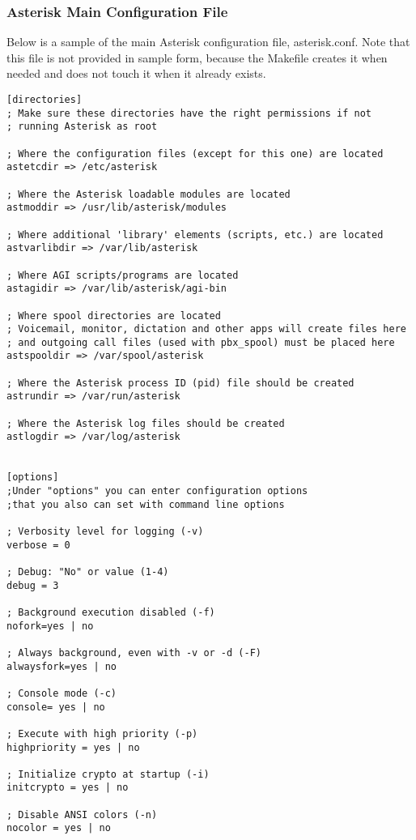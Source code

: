 \subsubsection{Asterisk Main Configuration File}

Below is a sample of the main Asterisk configuration file,
asterisk.conf. Note that this file is not provided in
sample form, because the Makefile creates it when needed
and does not touch it when it already exists.

\begin{verbatim}
[directories]
; Make sure these directories have the right permissions if not
; running Asterisk as root 

; Where the configuration files (except for this one) are located
astetcdir => /etc/asterisk

; Where the Asterisk loadable modules are located
astmoddir => /usr/lib/asterisk/modules

; Where additional 'library' elements (scripts, etc.) are located
astvarlibdir => /var/lib/asterisk

; Where AGI scripts/programs are located
astagidir => /var/lib/asterisk/agi-bin

; Where spool directories are located
; Voicemail, monitor, dictation and other apps will create files here
; and outgoing call files (used with pbx_spool) must be placed here
astspooldir => /var/spool/asterisk

; Where the Asterisk process ID (pid) file should be created
astrundir => /var/run/asterisk

; Where the Asterisk log files should be created
astlogdir => /var/log/asterisk


[options]
;Under "options" you can enter configuration options
;that you also can set with command line options

; Verbosity level for logging (-v)
verbose = 0

; Debug: "No" or value (1-4)
debug = 3					

; Background execution disabled (-f)
nofork=yes | no					

; Always background, even with -v or -d (-F)
alwaysfork=yes | no

; Console mode (-c)
console= yes | no

; Execute with high priority (-p)
highpriority = yes | no

; Initialize crypto at startup (-i)
initcrypto = yes | no

; Disable ANSI colors (-n)
nocolor = yes | no


\end{verbatim}
